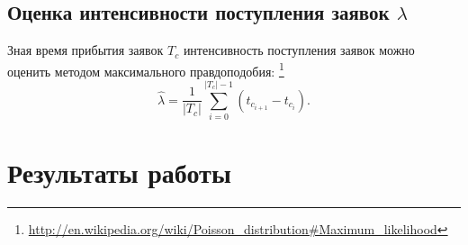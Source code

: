 \documentclass[a4paper,10pt]{article}
\begin{document}
\subsection{Оценка интенсивности поступления заявок $\lambda$}
Зная время прибытия заявок $T_c$ интенсивность поступления заявок можно оценить
методом максимального правдоподобия:
\footnote{\url{http://en.wikipedia.org/wiki/Poisson\_distribution\#Maximum\_likelihood}}
$$\hat{\lambda} = 
    \frac{1}{|T_c|} \sum\limits_{i=0}^{|T_c| - 1} (t_{c_{i+1}} - t_{c_i}).$$

\section{Результаты работы}




\pagebreak



\end{document}
